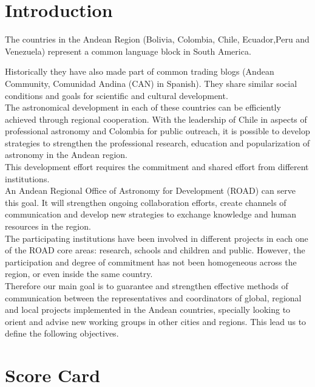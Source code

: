 \newpage
\section{Introduction}

The countries in the Andean Region (Bolivia, Colombia, Chile, Ecuador,Peru and Venezuela) represent a common language block in South America.
 
Historically they have also made part of common trading blogs (Andean Community, Comunidad Andina (CAN) in Spanish).
They share similar social conditions and goals for scientific and cultural development.
\\

The astronomical development in each of these countries can be efficiently achieved through regional cooperation. With the leadership of Chile in aspects of professional astronomy and Colombia for public outreach, it is possible to develop strategies to strengthen the professional research, education and popularization of astronomy in the Andean region.
\\

This development effort requires the commitment and shared effort from different institutions.
\\

An Andean Regional Office of Astronomy for Development (ROAD) can serve this goal. It will strengthen ongoing collaboration efforts, create channels of communication and develop new strategies to exchange knowledge and human resources in the region. 
\\

The participating institutions have been involved in different projects in each one of the ROAD core areas: research, schools and children and public. However, the participation and degree of commitment has not been homogeneous across the region, or even inside the same country.
\\

Therefore our main goal is to guarantee and strengthen effective methods of communication between the representatives and coordinators of global, regional and local projects implemented in the Andean countries, specially looking to orient and advise new working groups
in other cities and regions. This lead us to define the following objectives.
 

\newpage
\section{Score Card}

